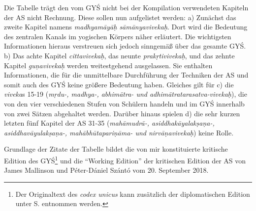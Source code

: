 \documentclass[a4paper,12pt]{article}
\begin{document}
Die Tabelle trägt den vom GYŚ nicht bei der Kompilation verwendeten Kapiteln der AS nicht Rechnung. Diese sollen nun aufgelistet werden: a) Zunächst das zweite Kapitel namens \textit{madhyamāyāḥ sāmānyavivekaḥ}. Dort wird die Bedeutung des zentralen Kanals im yogischen Körpers näher erläutert. Die wichtigsten Informationen hieraus verstreuen sich jedoch sinngemäß über das gesamte GYŚ. b) Das achte Kapitel \textit{cittavivekaḥ}, das neunte \textit{prakṛtivivekaḥ}, und das zehnte Kapitel \textit{guṇavivekaḥ} werden weitestgehend ausgelassen. Sie enthalten Informationen, die für die unmittelbare Durchführung der Techniken der AS und somit auch des GYŚ keine größere Bedeutung haben. Gleiches gilt für c) die \textit{viveka}s 15-19 (\textit{mṛdu-, madhya-, abhimātra- und adhimātratarasatva-vivekaḥ}), die von den vier verschiedenen Stufen von Schülern handeln und im GYŚ innerhalb von zwei Sätzen abgehaltet werden. Darüber hinaus spielen d) die sehr kurzen letzten fünf Kapitel der AS 31-35 (\textit{mahāmudrā-, asiddhakāyalakṣaṇa-, asiddhavāyulakṣaṇa-, mahābhūtapariṇāma- und nirvāṇavivekaḥ}) keine Rolle. 

Grundlage der Zitate der Tabelle bildet die von mir konstituierte kritische Edition des GYŚ\footnote{Der Originaltext des \textit{codex unicus} kann zusätzlich der diplomatischen Edition unter S. \pageref{diped} entnommen werden.} und die ``Working Edition'' der kritischen Edition der AS von James Mallinson und Péter-Dániel Szántó vom 20. September 2018. \clearpage
\end{document}
